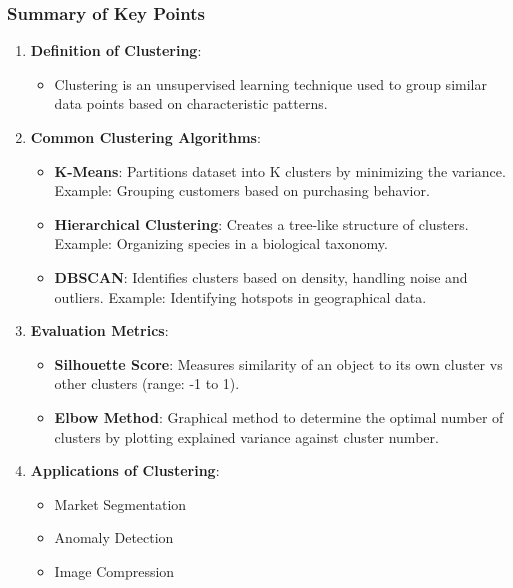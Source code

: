 \documentclass[aspectratio=169]{beamer}
\begin{document}
\begin{frame}[fragile]
    \frametitle{Summary of Key Points}
    
    \begin{enumerate}
        \item \textbf{Definition of Clustering}:
        \begin{itemize}
            \item Clustering is an unsupervised learning technique used to group similar data points based on characteristic patterns.
        \end{itemize}

        \item \textbf{Common Clustering Algorithms}:
        \begin{itemize}
            \item \textbf{K-Means}: Partitions dataset into K clusters by minimizing the variance. Example: Grouping customers based on purchasing behavior.
            \item \textbf{Hierarchical Clustering}: Creates a tree-like structure of clusters. Example: Organizing species in a biological taxonomy.
            \item \textbf{DBSCAN}: Identifies clusters based on density, handling noise and outliers. Example: Identifying hotspots in geographical data.
        \end{itemize}
        
        \item \textbf{Evaluation Metrics}:
        \begin{itemize}
            \item \textbf{Silhouette Score}: Measures similarity of an object to its own cluster vs other clusters (range: -1 to 1).
            \item \textbf{Elbow Method}: Graphical method to determine the optimal number of clusters by plotting explained variance against cluster number.
        \end{itemize}
        
        \item \textbf{Applications of Clustering}:
        \begin{itemize}
            \item Market Segmentation
            \item Anomaly Detection
            \item Image Compression
        \end{itemize}
    \end{enumerate}
\end{frame}
\end{document}
